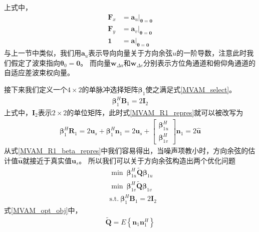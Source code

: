 \documentclass[master]{thesis-uestc}
\begin{document}
上式中，
\begin{subequations}
    \begin{align}
        \bm{F}_x &= \bm{a}_u|_{\bm{\theta}=\textbf{0}} \\
        \bm{F}_y &= \bm{a}_v|_{\bm{\theta}=\textbf{0}} \\
        \textbf{1} &= \bm{a}|_{\bm{\theta}=\textbf{0}}
    \end{align}
\end{subequations}
与上一节中类似，我们用$\bm{a}_u$表示导向向量关于方向余弦$u$的一阶导数，注意此时我们假定了波束指向$\bm{\theta}_0=\textbf{0}$。
而向量$\bm{w}_{\Delta a}$和$\bm{w}_{\Delta e}$分别表示方位角通道和俯仰角通道的自适应差波束权向量。

接下来我们定义一个$4\times2$的单脉冲选择矩阵$\bm{\beta}_1$使之满足式\eqref{MVAM_select}。
\begin{equation}\label{MVAM_select}
    \begin{aligned}
        \bm{\beta}_1^H\bm{B}_1=2\bm{I}_2
    \end{aligned}
\end{equation}
上式中，$\bm{I}_2$表示$2\times2$的单位矩阵，此时式\eqref{MVAM_R1_repres}就可以被改写为
\begin{equation}\label{MVAM_R1_beta_repres}
    \begin{aligned}
        \bm{\beta}^H_1\bm{R}_1 = 2\bm{u}_s + \bm{\beta}^H_1\bm{n}_1
        = 2\bm{u}_s + 
        \begin{bmatrix}
            \bm{\beta}_{1u}^H \\ \bm{\beta}_{1v}^H
        \end{bmatrix}
        \bm{n}_1 = 2\hat{\bm{u}}
    \end{aligned}
\end{equation}
从式\eqref{MVAM_R1_beta_repres}中我们容易得出，当噪声项教小时，方向余弦的估计值$\hat{\bm{u}}$就接近于真实值$\bm{u}_s$。
所以我们可以关于方向余弦构造出两个优化问题
\begin{equation}\label{MVAM_opt_obj}
    \begin{aligned}
        &\min ~ \bm{\beta}_{1u}^H\tilde{\bm{Q}}\bm{\beta}_{1u} \\
        &\min ~ \bm{\beta}_{1v}^H\tilde{\bm{Q}}\bm{\beta}_{1v} \\
        &\text{s.t.} ~ \bm{\beta}_1^H\bm{B}_1=2\bm{I}_2
    \end{aligned}
\end{equation}
式\eqref{MVAM_opt_obj}中，
\begin{equation}
    \begin{aligned}
        \tilde{\bm{Q}}=E\left\{\bm{n}_1\bm{n}_1^H\right\}
    \end{aligned}
\end{equation}
\end{document}
